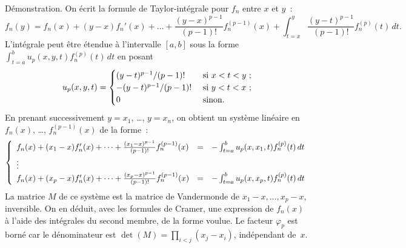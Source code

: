 {\begin{enumerate}
{    Démonstration. On écrit la formule de Taylor-intégrale pour $f_n$ entre
    $x$ et $y$~:
    $$f_n(y) = f_n(x) + (y-x)f_n'(x) + \dots + \frac{(y-x)^{p-1}}{(p-1)!}f_n^{(p-1)}(x)
             +  \int_{t=x}^y \frac{(y-t)^{p-1}}{(p-1)!}f_n^{(p)}(t)\,d t.$$
    L'intégrale peut être étendue à l'intervalle $[a,b]$ sous la forme
    $ \int_{t=a}^b u_p(x,y,t)f_n^{(p)}(t)\,d t$ en posant
    $$u_p(x,y,t) = \begin{cases}(y-t)^{p-1}/(p-1)!  & \text{ si } x < t < y~;\cr
                          -(y-t)^{p-1}/(p-1)! & \text{ si } y < t < x~;\cr
                          0                   & \text{ sinon}.\cr\end{cases}$$
    En prenant successivement $y=x_1$, \ldots, $y=x_n$, on obtient un
    système linéaire en $f_n(x)$, \dots, $f_n^{(p-1)}(x)$ de la forme~:
    $$\left\{\begin{array}{lll} f_n(x) + (x_1-x)f_n'(x) + \dots + \frac{(x_1-x)^{p-1}}{(p-1)!}f_n^{(p-1)}(x) &= &- \int_{t=a}^b u_p(x,x_1,t)f_n^{(p)}(t)\,d t\cr
             \noalign{\smallskip}\vdots\cr
             f_n(x) + (x_p-x)f_n'(x) + \dots + \frac{(x_p-x)^{p-1}}{(p-1)!}f_n^{(p-1)}(x) &= &- \int_{t=a}^b u_p(x,x_p,t)f_n^{(p)}(t)\,d t\cr\end{array}\right.$$
    La matrice $M$ de ce système est la matrice de Vandermonde de $x_1-x,\dots,x_p-x$,
    inversible. On en déduit, avec les
    formules de Cramer, une expression de $f_n(x)$ à l'aide des intégrales du second membre,
    de la forme voulue. Le facteur $\varphi_p$ est borné car le dénominateur
    est $\det(M) = \prod_{i<j}(x_j-x_i)$, indépendant de~$x$.
}
\end{enumerate}
}
